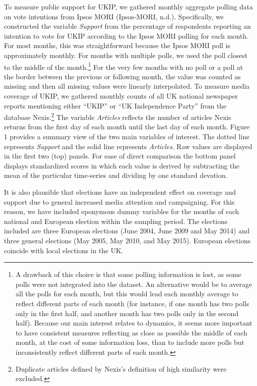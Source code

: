 \documentclass[12pt,article]{article}
\let\rmarkdownfootnote\footnote%
\def\footnote{\protect\rmarkdownfootnote}
\begin{document}
To measure public support for UKIP, we gathered monthly aggregate
polling data on vote intentions from Ipsos MORI (Ipsos-MORI, n.d.).
Specifically, we constructed the variable \emph{Support} from the
percentage of respondents reporting an intention to vote for UKIP
according to the Ipsos MORI polling for each month. For most months,
this was straightforward because the Ipsos MORI poll is approximately
monthly. For months with multiple polls, we used the poll closest to the
middle of the
month.\footnote{A drawback of this choice is that some polling information is lost, as some polls were not integrated into the dataset. An alternative would be to average all the polls for each month, but this would lead each monthly average to reflect different parts of each month (for instance, if one month has two polls only in the first half, and another month has two polls only in the second half). Because our main interest relates to dynamics, it seems more important to have consistent measures reflecting as close as possible the middle of each month, at the cost of some information loss, than to include more polls but inconsistently reflect different parts of each month.}
For the very few months with no poll or a poll at the border between the
previous or following month, the value was counted as missing and then
all missing values were linearly interpolated. To measure media coverage
of UKIP, we gathered monthly counts of all UK national newspaper reports
mentioning either ``UKIP'' or ``UK Independence Party'' from the
database
Nexis.\footnote{Duplicate articles defined by Nexis's definition of high similarity were excluded.}
The variable \emph{Articles} reflects the number of articles Nexis
returns from the first day of each month until the last day of each
month. Figure 1 provides a summary view of the two main variables of
interest. The dotted line represents \emph{Support} and the solid line
represents \emph{Articles}. Raw values are displayed in the first two
(top) panels. For ease of direct comparison the bottom panel displays
standardized scores in which each value is derived by subtracting the
mean of the particular time-series and dividing by one standard
devation.

It is also plausible that elections have an independent effect on
coverage and support due to general increased media attention and
campaigning. For this reason, we have included eponymous dummy variables
for the months of each national and European election within the
sampling period. The elections included are three European elections
(June 2004, June 2009 and May 2014) and three general elections (May
2005, May 2010, and May 2015). European elections coincide with local
elections in the UK.
\end{document}
